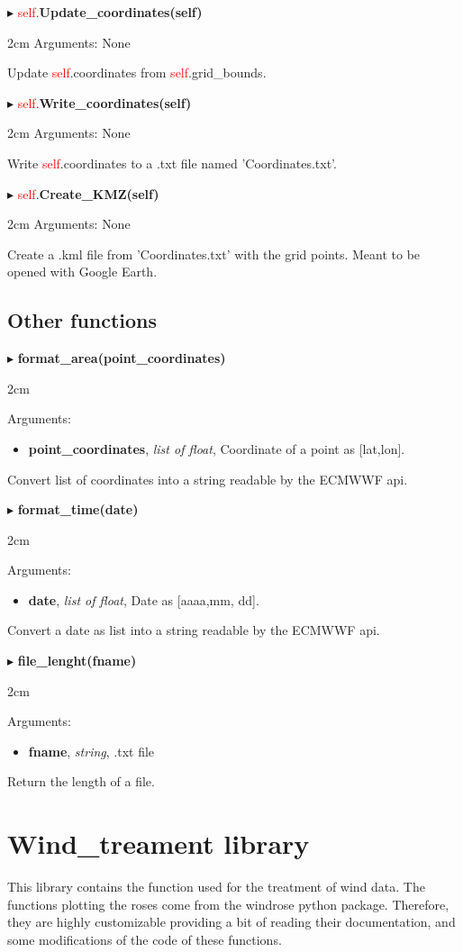 \documentclass[12pt]{article}
\newenvironment{myenv}{\begin{adjustwidth}{2cm}{}}{\end{adjustwidth}}
\newcommand{\ClassFunction}[3]{\filbreak\noindent
$\blacktriangleright$ \quad \textcolor{red}{self}.\textbf{#1}

\begin{myenv}
Arguments: {#2}

{#3}
\end{myenv}
\vspace*{0.4 cm}}
\newcommand{\Function}[3]{\filbreak\noindent
$\blacktriangleright$ \quad\textbf{#1}
\begin{myenv}

Arguments: {#2}

{#3}
\end{myenv}
\vspace*{0.4 cm}}
\newcommand{\Argument}[3]{\noindent 
\textbf{#1}, \textit{#2}, {#3}}
\begin{document}
\ClassFunction{Update\_coordinates(self)}{None}{Update \textcolor{red}{self}.coordinates from \textcolor{red}{self}.grid\_bounds.}

\ClassFunction{Write\_coordinates(self)}{None}{Write \textcolor{red}{self}.coordinates to a .txt file named 'Coordinates.txt'.}

\ClassFunction{Create\_KMZ(self)}{None}{Create a .kml file from 'Coordinates.txt' with the grid points. Meant to be opened with Google Earth.}

\subsection{Other functions}

\Function{format\_area(point\_coordinates)}{
\begin{itemize}
\item \Argument{point\_coordinates}{list of float}{Coordinate of a point as [lat,lon].}
\end{itemize}}{Convert list of coordinates into a string readable by the ECMWWF api.}

\Function{format\_time(date)}{
\begin{itemize}
\item \Argument{date}{list of float}{Date as [aaaa,mm, dd].}
\end{itemize}}{Convert a date as list into a string readable by the ECMWWF api.}

\Function{file\_lenght(fname)}{
\begin{itemize}
\item \Argument{fname}{string}{.txt file}
\end{itemize}}{Return the length of a file.}


\section{Wind\_treament library}
This library contains the function used for the treatment of wind data. The functions plotting the roses come from the windrose python package. Therefore, they are highly customizable providing a bit of reading their documentation, and some modifications of the code of these functions. 
\end{document}
